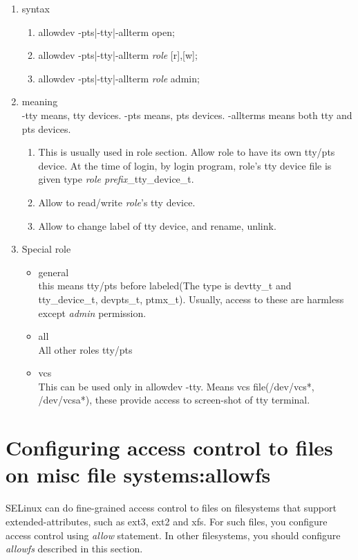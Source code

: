 \documentclass{article}
\begin{document}
\begin{enumerate}
 \item syntax
      \begin{enumerate}
       \item allowdev -pts|-tty|-allterm open;
       \item allowdev -pts|-tty|-allterm {\it role} [r],[w];  
       \item allowdev -pts|-tty|-allterm {\it role} admin;
      \end{enumerate}
 \item meaning\\
       -tty means, tty devices. -pts means, pts devices. -allterms means
       both tty and pts devices.
       \begin{enumerate}
	\item This is usually used in role section. Allow role to have
	      its own tty/pts device. At the time of login, by login
	      program, role's tty device file is given type {\it {\it role prefix}}\_tty\_device\_t. 
	\item  Allow to read/write {\it {\it role}}'s tty
	      device. 
	\item Allow to change label of tty device, and rename, unlink.
       \end{enumerate}
       \item Special role\\
       \begin{itemize}
	\item general\\
	      this means tty/pts before labeled(The type is devtty\_t
	      and tty\_device\_t, devpts\_t, ptmx\_t). Usually, access
	      to these are harmless except {\it admin } permission.
	\item all\\
	      All other roles tty/pts
	\item vcs\\
	      This can be used only in allowdev -tty. Means vcs file(/dev/vcs*, /dev/vcsa*), these provide access to screen-shot of tty terminal. 
       \end{itemize}

\end{enumerate}

\section{Configuring access control to files on misc file systems:allowfs}
 SELinux can do fine-grained access control to files on filesystems that
 support extended-attributes, such as ext3, ext2 and xfs. For such files,
 you configure access control using {\it allow} statement. In other
 filesystems, you should configure {\it allowfs} described in this
 section.
\end{document}

